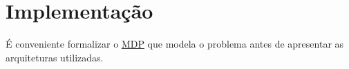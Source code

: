 


\chapter{Implementação}
\label{cap:implementacao}


É conveniente formalizar o \hyperref[sec:mdp]{MDP} que modela o problema antes de apresentar as arquiteturas utilizadas.

